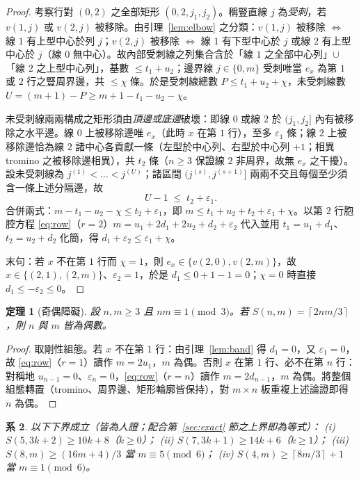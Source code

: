 \documentclass[11pt]{ctexart}
\newtheorem{theorem}{定理}[section]
\newtheorem{corollary}[theorem]{系}
\theoremstyle{definition}
\newcommand{\ceil}[1]{\left\lceil #1 \right\rceil}
\begin{document}
\begin{proof}
考察行對 $(0,2)$ 之全部矩形 $(0,2,j_1,j_2)$。稱豎直線 $j$ 為\emph{受刺}，若 $v(1,j)$ 或 $v(2,j)$ 被移除。由引理~\ref{lem:elbow} 之分類：$v(1,j)$ 被移除 $\iff$ 線 $1$ 有上型中心於列 $j$；$v(2,j)$ 被移除 $\iff$ 線 $1$ 有下型中心於 $j$ 或線 $2$ 有上型中心於 $j$（線 $0$ 無中心）。故內部受刺線之列集合含於「線 $1$ 之全部中心列」$\cup$「線 $2$ 之上型中心列」，基數 $\le t_1+u_2$；邊界線 $j\in\{0,m\}$ 受刺唯當 $e_x$ 為第 $1$ 或 $2$ 行之豎周界邊，共 $\le\chi$ 條。於是受刺線總數 $P\le t_1+u_2+\chi$，未受刺線數 $U=(m{+}1)-P\ge m+1-t_1-u_2-\chi$。

未受刺線兩兩構成之矩形須由\emph{頂邊或底邊}破壞：即線 $0$ 或線 $2$ 於 $(j_1,j_2]$ 內有被移除之水平邊。線 $0$ 上被移除邊唯 $e_x$（此時 $x$ 在第 $1$ 行），至多 $\varepsilon_1$ 條；線 $2$ 上被移除邊恰為線 $2$ 諸中心各貢獻一條（左型於中心列、右型於中心列 $+1$；相異 tromino 之被移除邊相異），共 $t_2$ 條（$n\ge3$ 保證線 $2$ 非周界，故無 $e_x$ 之干擾）。設未受刺線為 $j^{(1)}<\dots<j^{(U)}$；諸區間 $(j^{(s)},j^{(s+1)}]$ 兩兩不交且每個至少須含一條上述分隔邊，故
\[
U-1\;\le\;t_2+\varepsilon_1 .
\]
合併兩式：$m-t_1-u_2-\chi\le t_2+\varepsilon_1$，即 $m\le t_1+u_2+t_2+\varepsilon_1+\chi$。以第 $2$ 行胞腔方程 \eqref{eq:row}（$r=2$）$m=u_1+2d_1+2u_2+d_2+\varepsilon_2$ 代入並用 $t_1=u_1+d_1$、$t_2=u_2+d_2$ 化簡，得 $d_1+\varepsilon_2\le\varepsilon_1+\chi$。

末句：若 $x$ 不在第 $1$ 行而 $\chi=1$，則 $e_x\in\{v(2,0),v(2,m)\}$，故 $x\in\{(2,1),(2,m)\}$、$\varepsilon_2=1$，於是 $d_1\le0+1-1=0$；$\chi=0$ 時直接 $d_1\le-\varepsilon_2\le0$。
\end{proof}

\begin{theorem}[奇偶障礙]\label{thm:parity}
設 $n,m\ge3$ 且 $nm\equiv1\pmod3$。若 $S(n,m)=\ceil{2nm/3}$，則 $n$ 與 $m$ 皆為偶數。
\end{theorem}

\begin{proof}
取剛性組態。若 $x$ 不在第 $1$ 行：由引理~\ref{lem:band} 得 $d_1=0$，又 $\varepsilon_1=0$，故 \eqref{eq:row}（$r=1$）讀作 $m=2u_1$，$m$ 為偶。否則 $x$ 在第 $1$ 行、必不在第 $n$ 行：對稱地 $u_{n-1}=0$、$\varepsilon_n=0$，\eqref{eq:row}（$r=n$）讀作 $m=2d_{n-1}$，$m$ 為偶。將整個組態轉置（tromino、周界邊、矩形輪廓皆保持），對 $m\times n$ 板重複上述論證即得 $n$ 為偶。
\end{proof}

\begin{corollary}\label{cor:families}
以下下界成立（皆為人證；配合第~\ref{sec:exact} 節之上界即為等式）：
\emph{(i)} $S(5,3k{+}2)\ge 10k+8$（$k\ge0$）；
\emph{(ii)} $S(7,3k{+}1)\ge 14k+6$（$k\ge1$）；
\emph{(iii)} $S(8,m)\ge (16m+4)/3$ 當 $m\equiv5\pmod6$；
\emph{(iv)} $S(4,m)\ge\ceil{8m/3}+1$ 當 $m\equiv1\pmod6$。
\end{corollary}
\end{document}
